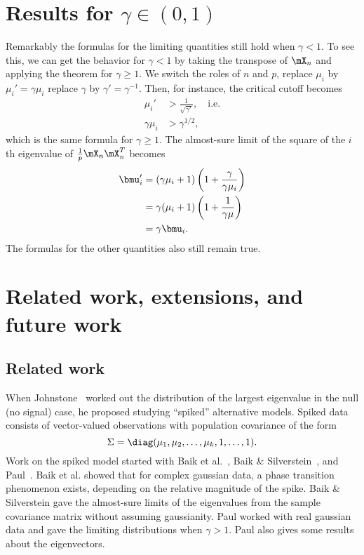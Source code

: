 \section{Results for $\gamma \in (0,1)$}\label{S:lowrank-gamma-lt-1}

Remarkably the formulas for the limiting quantities still hold when $\gamma < 1$.  To see this, we can get the behavior for $\gamma < 1$ by taking the transpose of $\mX_n$ and applying the theorem for $\gamma \geq 1$.  We switch the roles of $n$ and $p$, replace $\mu_i$ by $\mu_i' = \gamma \mu_i$ replace $\gamma$ by $\gamma' = \gamma^{-1}$.  Then, for instance, the critical cutoff becomes
\begin{align*}
    \mu_i' &> \frac{1}{\sqrt{\gamma'}}, \quad\text{i.e.} \\
    \gamma \mu_i &> \gamma^{1/2},
\end{align*}
which is the same formula for $\gamma \geq 1$.  The almost-sure limit of
the square of the $i$th eigenvalue of $\frac{1}{p} \mX_n \mX_n^T$ becomes
\begin{align*}
    \bmu_i'
        &= ( \gamma \mu_i + 1 )
           \left( 1 + \frac{\gamma}{ \gamma \mu_i } \right) \\
        &= \gamma ( \mu_i + 1 ) \left( 1 + \frac{1}{\gamma \mu} \right) \\
        &= \gamma \bmu_i.
\end{align*}
The formulas for the other quantities also still remain true.

\section{Related work, extensions, and future work}\label{S:lowrank-related-extensions}

\subsection{Related work}

When Johnstone~\cite{johnstone2001dle} worked out the distribution of the largest eigenvalue in the null (no signal) case, he proposed studying ``spiked'' alternative models.  Spiked data consists of vector-valued observations with population covariance of the form
\[
    \Sigma = \diag( \mu_1, \mu_2, \ldots, \mu_k, 1, \ldots, 1 ).
\]
Work on the spiked model started with Baik et al.~\cite{baik2005ptl}, 
Baik \& Silverstein~\cite{baik2006els}, and Paul~\cite{paul2007ase}.  Baik et al. showed that for complex gaussian data, a phase transition phenomenon exists, depending on the relative magnitude of the spike.  Baik \& Silverstein gave the almost-sure limits of the eigenvalues from the sample covariance matrix without assuming gaussianity.  Paul worked with real gaussian data and gave the limiting distributions when $\gamma > 1$.  Paul also gives some results about the eigenvectors.


